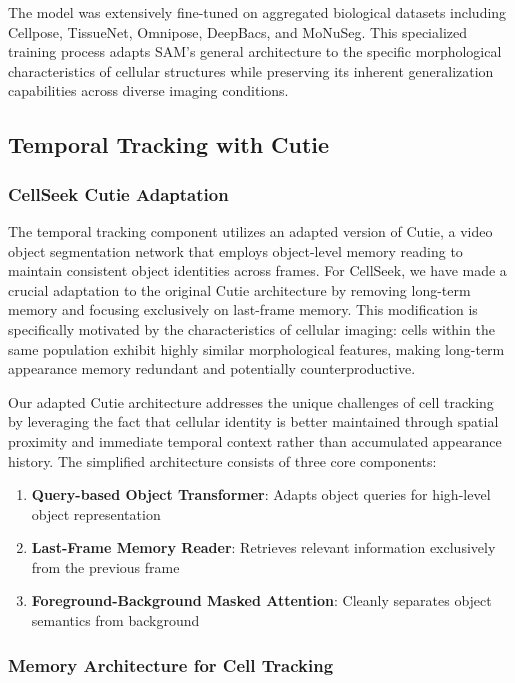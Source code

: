 \documentclass[../cellseek_paper.tex]{subfiles}
\begin{document}
The model was extensively fine-tuned on aggregated biological datasets including Cellpose, TissueNet, Omnipose, DeepBacs, and MoNuSeg. This specialized training process adapts SAM's general architecture to the specific morphological characteristics of cellular structures while preserving its inherent generalization capabilities across diverse imaging conditions.

\subsection{Temporal Tracking with Cutie}

\subsubsection{CellSeek Cutie Adaptation}

The temporal tracking component utilizes an adapted version of Cutie, a video object segmentation network that employs object-level memory reading to maintain consistent object identities across frames. For CellSeek, we have made a crucial adaptation to the original Cutie architecture by removing long-term memory and focusing exclusively on last-frame memory. This modification is specifically motivated by the characteristics of cellular imaging: cells within the same population exhibit highly similar morphological features, making long-term appearance memory redundant and potentially counterproductive.

Our adapted Cutie architecture addresses the unique challenges of cell tracking by leveraging the fact that cellular identity is better maintained through spatial proximity and immediate temporal context rather than accumulated appearance history. The simplified architecture consists of three core components:

\begin{enumerate}
  \item \textbf{Query-based Object Transformer}: Adapts object queries for high-level object representation
  \item \textbf{Last-Frame Memory Reader}: Retrieves relevant information exclusively from the previous frame
  \item \textbf{Foreground-Background Masked Attention}: Cleanly separates object semantics from background
\end{enumerate}

\subsubsection{Memory Architecture for Cell Tracking}
\end{document}
